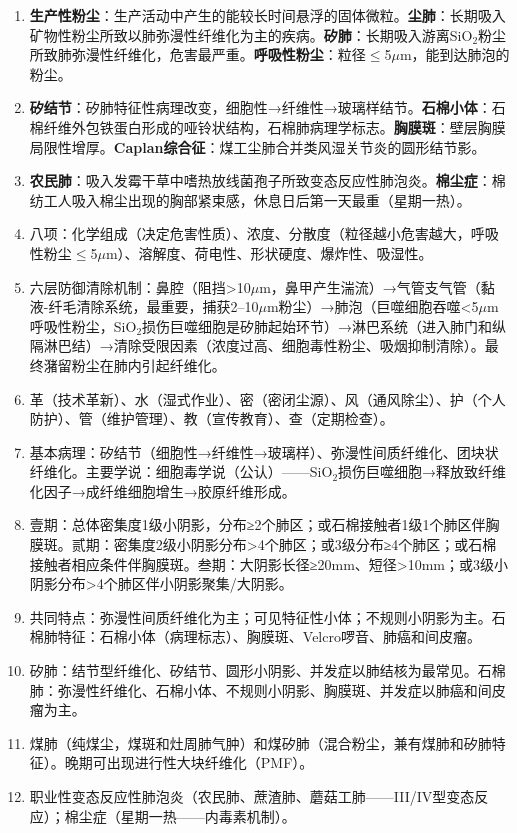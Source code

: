 \begin{enumerate}[leftmargin=*, itemsep=5pt]
    \item \textbf{生产性粉尘}：生产活动中产生的能较长时间悬浮的固体微粒。\textbf{尘肺}：长期吸入矿物性粉尘所致以肺弥漫性纤维化为主的疾病。\textbf{矽肺}：长期吸入游离SiO$_2$粉尘所致肺弥漫性纤维化，危害最严重。\textbf{呼吸性粉尘}：粒径$\leq$5$\mu$m，能到达肺泡的粉尘。
    \item \textbf{矽结节}：矽肺特征性病理改变，细胞性→纤维性→玻璃样结节。\textbf{石棉小体}：石棉纤维外包铁蛋白形成的哑铃状结构，石棉肺病理学标志。\textbf{胸膜斑}：壁层胸膜局限性增厚。\textbf{Caplan综合征}：煤工尘肺合并类风湿关节炎的圆形结节影。
    \item \textbf{农民肺}：吸入发霉干草中嗜热放线菌孢子所致变态反应性肺泡炎。\textbf{棉尘症}：棉纺工人吸入棉尘出现的胸部紧束感，休息日后第一天最重（星期一热）。
    \item 八项：化学组成（决定危害性质）、浓度、分散度（粒径越小危害越大，呼吸性粉尘$\leq$5$\mu$m）、溶解度、荷电性、形状硬度、爆炸性、吸湿性。
    \item 六层防御清除机制：鼻腔（阻挡>10$\mu$m，鼻甲产生湍流）→气管支气管（黏液-纤毛清除系统，最重要，捕获2--10$\mu$m粉尘）→肺泡（巨噬细胞吞噬<5$\mu$m呼吸性粉尘，SiO$_2$损伤巨噬细胞是矽肺起始环节）→淋巴系统（进入肺门和纵隔淋巴结）→清除受限因素（浓度过高、细胞毒性粉尘、吸烟抑制清除）。最终潴留粉尘在肺内引起纤维化。
    \item 革（技术革新）、水（湿式作业）、密（密闭尘源）、风（通风除尘）、护（个人防护）、管（维护管理）、教（宣传教育）、查（定期检查）。
    \item 基本病理：矽结节（细胞性→纤维性→玻璃样）、弥漫性间质纤维化、团块状纤维化。主要学说：细胞毒学说（公认）——SiO$_2$损伤巨噬细胞→释放致纤维化因子→成纤维细胞增生→胶原纤维形成。
    \item 壹期：总体密集度1级小阴影，分布≥2个肺区；或石棉接触者1级1个肺区伴胸膜斑。贰期：密集度2级小阴影分布>4个肺区；或3级分布≥4个肺区；或石棉接触者相应条件伴胸膜斑。叁期：大阴影长径≥20mm、短径>10mm；或3级小阴影分布>4个肺区伴小阴影聚集/大阴影。
    \item 共同特点：弥漫性间质纤维化为主；可见特征性小体；不规则小阴影为主。石棉肺特征：石棉小体（病理标志）、胸膜斑、Velcro啰音、肺癌和间皮瘤。
    \item 矽肺：结节型纤维化、矽结节、圆形小阴影、并发症以肺结核为最常见。石棉肺：弥漫性纤维化、石棉小体、不规则小阴影、胸膜斑、并发症以肺癌和间皮瘤为主。
    \item 煤肺（纯煤尘，煤斑和灶周肺气肿）和煤矽肺（混合粉尘，兼有煤肺和矽肺特征）。晚期可出现进行性大块纤维化（PMF）。
    \item 职业性变态反应性肺泡炎（农民肺、蔗渣肺、蘑菇工肺——III/IV型变态反应）；棉尘症（星期一热——内毒素机制）。
\end{enumerate}

\newpage

\newpage